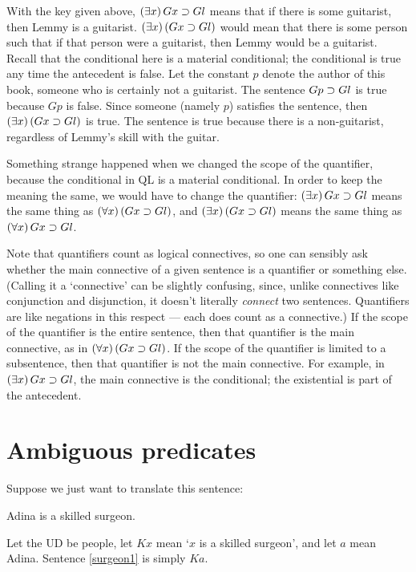 With the key given above, $(\exists x) \, Gx \supset Gl$ means that if there is some guitarist, then Lemmy is a guitarist. $(\exists x) \, (Gx \supset Gl)$ would mean that there is some person such that if that person were a guitarist, then Lemmy would be a guitarist. Recall that the conditional here is a material conditional; the conditional is true any time the antecedent is false. Let the constant $p$ denote the author of this book, someone who is certainly not a guitarist. The sentence $Gp \supset Gl$ is true because $Gp$ is false. Since someone (namely $p$) satisfies the sentence, then $(\exists x) \, (Gx \supset Gl)$ is true. The sentence is true because there is a non-guitarist, regardless of Lemmy's skill with the guitar.

Something strange happened when we changed the scope of the quantifier, because the conditional in QL is a material conditional. In order to keep the meaning the same, we would have to change the quantifier: $(\exists x) \, Gx \supset Gl$ means the same thing as $(\forall x) \, (Gx \supset Gl)$, and $(\exists x) \, (Gx \supset Gl)$ means the same thing as $(\forall x) \, Gx \supset Gl$.


Note that quantifiers count as logical connectives, so one can sensibly ask whether the main connective of a given sentence is a quantifier or something else. (Calling it a `connective' can be slightly confusing, since, unlike connectives like conjunction and disjunction, it doesn't literally \emph{connect} two sentences. Quantifiers are like negations in this respect --- each does count as a connective.) If the scope of the quantifier is the entire sentence, then that quantifier is the main connective, as in $(\forall x) \, (Gx \supset Gl)$. If the scope of the quantifier is limited to a subsentence, then that quantifier is not the main connective. For example, in $(\exists x) \, Gx \supset Gl$, the main connective is the conditional; the existential is part of the antecedent.

\section{Ambiguous predicates}

Suppose we just want to translate this sentence:
\begin{earg}
\item[\ex{surgeon1}] Adina is a skilled surgeon.
\end{earg}
Let the UD be people, let $Kx$ mean `$x$ is a skilled surgeon', and let $a$ mean Adina. Sentence \ref{surgeon1} is simply $Ka$.


